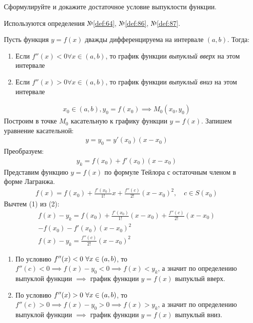 \begin{question}
    Сформулируйте и докажите достаточное условие выпуклости функции.
\end{question}
\begin{used}
    Используются определения №\ref{def:64}, №\ref{def:86}, №\ref{def:87}.
\end{used}
\begin{theorem}
    Пусть функция $y = f(x)$ дважды дифференцируема на интервале  $(a, b)$. 
    Тогда: 
    \begin{enumerate}
        \item Если  $f''(x) < 0 \forall  x \in (a, b)$, то график функции \textit{выпуклый вверх} на этом интервале
        \item Если  $f''(x) > 0 \forall  x \in (a, b)$, то график функции \textit{выпуклый вниз} на этом интервале
    \end{enumerate}
\end{theorem}
\begin{sufficiency}
    \begin{gather*}
        x_0 \in (a, b), y_0 = f(x_0) \implies M_0(x_0, y_0)
    \end{gather*}
    Построим в точке $M_0$ касательную к графику функции $y = f(x)$. Запишем уравнение касательной:
    \begin{gather*}
        y = y_0 = y'(x_0)(x - x_0) 
    \end{gather*}
    Преобразуем:
    \begin{gather*}
        y_k = f(x_0) + f'(x_0)(x - x_0) \tag{1} 
    \end{gather*}
    Представим функцию $y=f(x)$ по формуле Тейлора с остаточным членом в форме Лагранжа.
    \begin{gather*}
        f(x) = f(x_0) + \frac{f'(x_0)}{1!}x + \frac{f''(c)}{2!}(x - x_0)^2, \quad c \in S(x_0) \tag{2} 
    \end{gather*}
    Вычтем (1) из (2):
    \begin{gather*}
        f(x) - y_k = f(x_0) + \frac{f'(x_{0})}{1!}(x - x_0) + \frac{f''(c)}{2!}(x - x_0)\\
             - f(x_0) - f'(x_0)(x - x_0)^2 \\
        f(x) - y_k = \frac{f''(c)}{2!}(x - x_0)^2
    \end{gather*}
    \begin{enumerate}
        \item По условию $f''(x) < 0 \nobreakspace \forall x \in (a, b)$, то $f''(c) < 0 \implies f(x) - y_0 < 0 \implies f(x) < y_k$, а значит по определению выпуклой функции $\implies$ график функции $y = f(x)$ выпуклый вверх.
        \item По условию $f''(x) > 0 \nobreakspace \forall x \in (a, b)$, то $f''(c) > 0 \implies f(x) - y_0 > 0 \implies f(x) > y_k$, а значит по определению выпуклой функции $\implies$ график функции $y = f(x)$ выпуклый вниз.
    \end{enumerate}
\end{sufficiency}
\pagebreak



